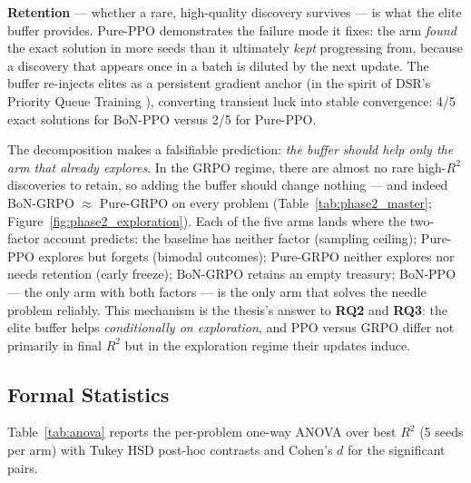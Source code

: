 \textbf{Retention} --- whether a rare, high-quality discovery survives --- is what the elite buffer provides. Pure-PPO demonstrates the failure mode it fixes: the arm \emph{found} the exact solution in more seeds than it ultimately \emph{kept} progressing from, because a discovery that appears once in a batch is diluted by the next update. The buffer re-injects elites as a persistent gradient anchor (in the spirit of DSR's Priority Queue Training \cite{petersen2020deep}), converting transient luck into stable convergence: 4/5 exact solutions for BoN-PPO versus 2/5 for Pure-PPO.

The decomposition makes a falsifiable prediction: \emph{the buffer should help only the arm that already explores}. In the GRPO regime, there are almost no rare high-$R^2$ discoveries to retain, so adding the buffer should change nothing --- and indeed BoN-GRPO $\approx$ Pure-GRPO on every problem (Table~\ref{tab:phase2_master}; Figure~\ref{fig:phase2_exploration}). Each of the five arms lands where the two-factor account predicts: the baseline has neither factor (sampling ceiling); Pure-PPO explores but forgets (bimodal outcomes); Pure-GRPO neither explores nor needs retention (early freeze); BoN-GRPO retains an empty treasury; BoN-PPO --- the only arm with both factors --- is the only arm that solves the needle problem reliably. This mechanism is the thesis's answer to \textbf{RQ2} and \textbf{RQ3}: the elite buffer helps \emph{conditionally on exploration}, and PPO versus GRPO differ not primarily in final $R^2$ but in the exploration regime their updates induce.

\subsection{Formal Statistics}
\label{sec:phase2_stats}

Table~\ref{tab:anova} reports the per-problem one-way ANOVA over best $R^2$ (5 seeds per arm) with Tukey HSD post-hoc contrasts and Cohen's $d$ for the significant pairs.

